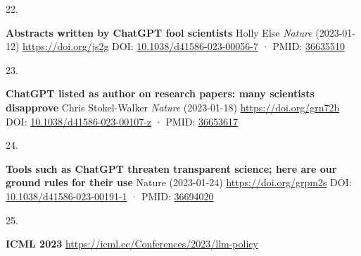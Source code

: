 \documentclass[
]{article}
\newlength{\cslhangindent}
\newlength{\csllabelwidth}
\newlength{\cslentryspacingunit} %
\newenvironment{CSLReferences}[2] %
 {%
  \setlength{\parindent}{0pt}
  \ifodd #1
  \let\oldpar\par
  \def\par{\hangindent=\cslhangindent\oldpar}
  \fi
  \setlength{\parskip}{#2\cslentryspacingunit}
 }%
 {}
\newcommand{\CSLBlock}[1]{#1\hfill\break}
\newcommand{\CSLLeftMargin}[1]{\parbox[t]{\csllabelwidth}{#1}}
\newcommand{\CSLRightInline}[1]{\parbox[t]{\linewidth - \csllabelwidth}{#1}\break}
\begin{document}
\begin{CSLReferences}{0}{0}
\leavevmode{}%
\CSLLeftMargin{22. }%
\CSLRightInline{\textbf{Abstracts written by ChatGPT fool scientists}
\CSLBlock{Holly Else} \emph{Nature} (2023-01-12) \url{https://doi.org/js2g}
\CSLBlock{DOI: \href{https://doi.org/10.1038/d41586-023-00056-7}{10.1038/d41586-023-00056-7} · PMID: \href{https://www.ncbi.nlm.nih.gov/pubmed/36635510}{36635510}}}

\leavevmode{}%
\CSLLeftMargin{23. }%
\CSLRightInline{\textbf{ChatGPT listed as author on research papers: many scientists disapprove}
\CSLBlock{Chris Stokel-Walker} \emph{Nature} (2023-01-18) \url{https://doi.org/grn72b}
\CSLBlock{DOI: \href{https://doi.org/10.1038/d41586-023-00107-z}{10.1038/d41586-023-00107-z} · PMID: \href{https://www.ncbi.nlm.nih.gov/pubmed/36653617}{36653617}}}

\leavevmode{}%
\CSLLeftMargin{24. }%
\CSLRightInline{\textbf{Tools such as ChatGPT threaten transparent science; here are our ground rules for their use}
\CSLBlock{Nature} (2023-01-24) \url{https://doi.org/grpm2s}
\CSLBlock{DOI: \href{https://doi.org/10.1038/d41586-023-00191-1}{10.1038/d41586-023-00191-1} · PMID: \href{https://www.ncbi.nlm.nih.gov/pubmed/36694020}{36694020}}}

\leavevmode{}%
\CSLLeftMargin{25. }%
\CSLRightInline{\textbf{ICML 2023} \url{https://icml.cc/Conferences/2023/llm-policy}}

\end{CSLReferences}
\end{document}
